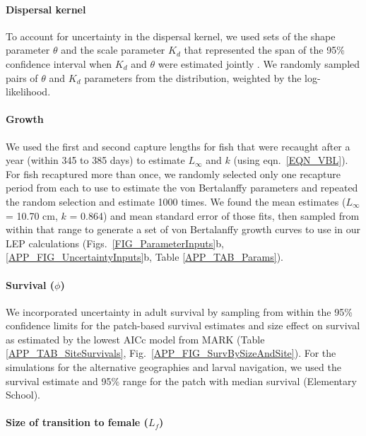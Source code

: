 \documentclass[12pt, oneside]{article}   	%
\begin{document}
\paragraph*{Dispersal kernel} %

To account for uncertainty in the dispersal kernel, we used sets of the shape parameter $\theta$ and the scale parameter $K_d$ that represented the span of the 95\% confidence interval when $K_d$ and $\theta$ were estimated jointly \citep[Table \ref{APP_TAB_Params}, Fig.\ \ref{FIG_ParameterInputs}a,][]{catalanoInPrepconnectivity}. We randomly sampled pairs of $\theta$ and $K_d$ parameters from the distribution, weighted by the log-likelihood.

\paragraph*{Growth} %

We used the first and second capture lengths for fish that were recaught after a year (within 345 to 385 days) to estimate $L_\infty$ and $k$ (using eqn.\ \ref{EQN_VBL}). For fish recaptured more than once, we randomly selected only one recapture period from each to use to estimate the von Bertalanffy parameters and repeated the random selection and estimate 1000 times. We found the mean estimates ($L_\infty$ = 10.70 cm, $k$ = 0.864) and mean standard error of those fits, then sampled from within that range to generate a set of von Bertalanffy growth curves to use in our LEP calculations (Figs.\ \ref{FIG_ParameterInputs}b, \ref{APP_FIG_UncertaintyInputs}b,  Table \ref{APP_TAB_Params}).

\paragraph*{Survival ($\phi$)} %

We incorporated uncertainty in adult survival by sampling from within the 95\% confidence limits for the patch-based survival estimates and size effect on survival as estimated by the lowest AICc model from MARK (Table \ref{APP_TAB_SiteSurvivals}, Fig.\ \ref{APP_FIG_SurvBySizeAndSite}). For the simulations for the alternative geographies and larval navigation, we used the survival estimate and 95\% range for the patch with median survival (Elementary School).

\paragraph*{Size of transition to female ($L_f$)} %
\end{document}
